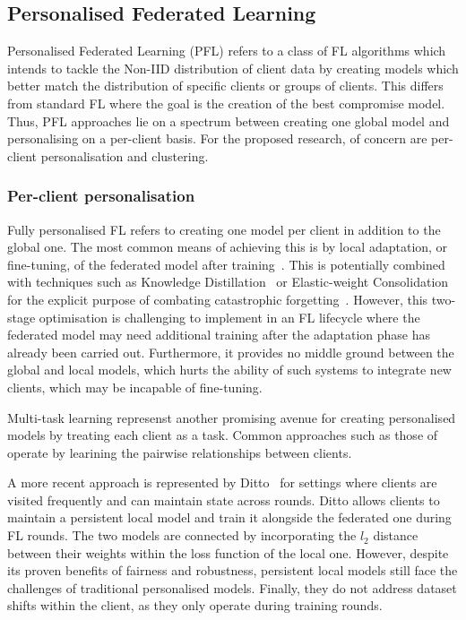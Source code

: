 \subsection{Personalised Federated Learning}

Personalised Federated Learning (PFL) refers to a class of FL algorithms which intends to tackle the Non-IID distribution of client data by creating models which better match the distribution of specific clients or groups of clients. This differs from standard FL where the goal is the creation of the best compromise model. Thus, PFL approaches lie on a spectrum between creating one global model and personalising on a per-client basis. For the proposed research, of concern are per-client personalisation and clustering.

\subsubsection{Per-client personalisation}

Fully personalised FL refers to creating one model per client in addition to the global one. The most common means of achieving this is by local adaptation, or fine-tuning, of the federated model after training~\citep{SalvagingFL}. This is potentially combined with techniques such as Knowledge Distillation~\citep{DeepMutualLearning} or Elastic-weight Consolidation~\citep{kirkpatrick2017overcoming} for the explicit purpose of combating catastrophic forgetting~\citep{CatForgetting1}. However, this two-stage optimisation is challenging to implement in an FL lifecycle where the federated model may need additional training after the adaptation phase has already been carried out. Furthermore, it provides no middle ground between the global and local models, which hurts the ability of such systems to integrate new clients, which may be incapable of fine-tuning.


Multi-task learning represenst another promising avenue for creating personalised models by treating each client as a task. Common approaches such as those of  operate by learining the pairwise relationships between clients.

A more recent approach is represented by Ditto~\citep{Ditto} for settings where clients are visited frequently and can maintain state across rounds. Ditto allows clients to maintain a persistent local model and train it alongside the federated one during FL rounds. The two models are connected by incorporating the $l_2$ distance between their weights within the loss function of the local one. However, despite its proven benefits of fairness and robustness, persistent local models still face the challenges of traditional personalised models. Finally, they do not address dataset shifts within the client, as they only operate during training rounds.


